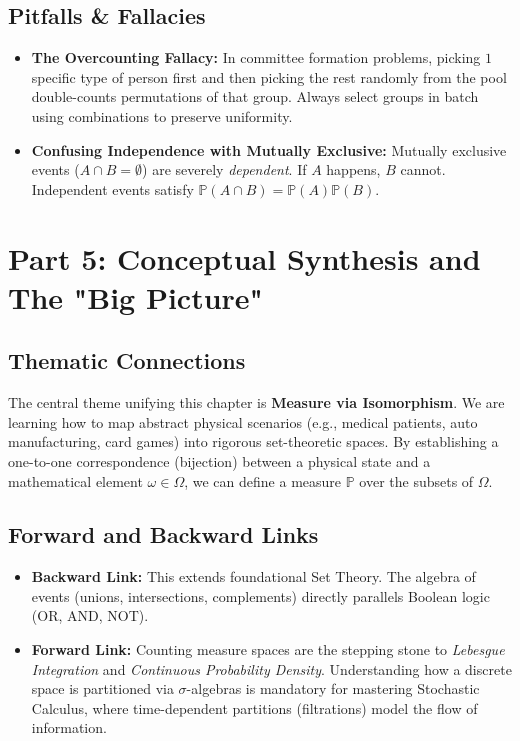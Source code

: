 \documentclass[11pt]{article}
\theoremstyle{definition}
\begin{document}
\subsection{Pitfalls \& Fallacies}
\begin{itemize}
    \item \textbf{The Overcounting Fallacy:} In committee formation problems, picking $1$ specific type of person first and then picking the rest randomly from the pool double-counts permutations of that group. Always select groups in batch using combinations to preserve uniformity.
    \item \textbf{Confusing Independence with Mutually Exclusive:} Mutually exclusive events ($A \cap B = \emptyset$) are severely \textit{dependent}. If $A$ happens, $B$ cannot. Independent events satisfy $\mathbb{P}(A \cap B) = \mathbb{P}(A)\mathbb{P}(B)$.
\end{itemize}


\section{Part 5: Conceptual Synthesis and The "Big Picture"}

\subsection{Thematic Connections}
The central theme unifying this chapter is \textbf{Measure via Isomorphism}. We are learning how to map abstract physical scenarios (e.g., medical patients, auto manufacturing, card games) into rigorous set-theoretic spaces. By establishing a one-to-one correspondence (bijection) between a physical state and a mathematical element $\omega \in \Omega$, we can define a measure $\mathbb{P}$ over the subsets of $\Omega$.

\subsection{Forward and Backward Links}
\begin{itemize}
    \item \textbf{Backward Link:} This extends foundational Set Theory. The algebra of events (unions, intersections, complements) directly parallels Boolean logic (OR, AND, NOT).
    \item \textbf{Forward Link:} Counting measure spaces are the stepping stone to \textit{Lebesgue Integration} and \textit{Continuous Probability Density}. Understanding how a discrete space is partitioned via $\sigma$-algebras is mandatory for mastering Stochastic Calculus, where time-dependent partitions (filtrations) model the flow of information.
\end{itemize}
\end{document}
